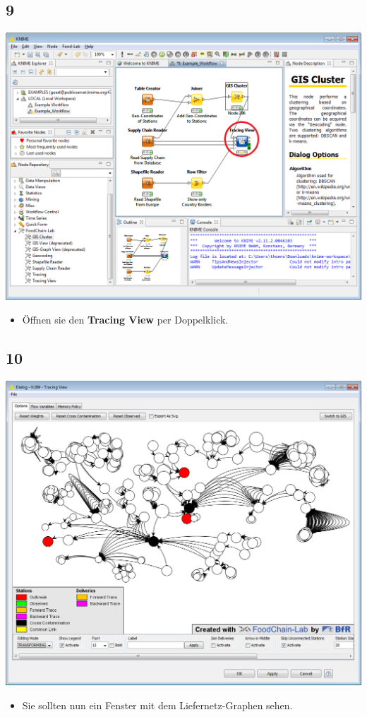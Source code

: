 \documentclass{beamer}
\begin{document}
\subsection{9}
\begin{frame}
	\begin{center}
  		\includegraphics[height=0.6\textheight]{9.png}
	\end{center}
	\begin{itemize}
		\item Öffnen sie den \textbf{Tracing View} per Doppelklick.
	\end{itemize}
\end{frame}

\subsection{10}
\begin{frame}
	\begin{center}
  		\includegraphics[height=0.6\textheight]{10.png}
	\end{center}
	\begin{itemize}
		\item Sie sollten nun ein Fenster mit dem Liefernetz-Graphen sehen.
	\end{itemize}
\end{frame}
\end{document}
